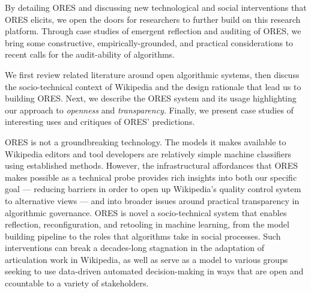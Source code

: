 By detailing ORES and discussing new technological and social interventions that ORES elicits, we open the doors for researchers to further build on this research platform\cite{terveen2014study}.  Through case studies of emergent reflection and auditing of ORES, we bring some constructive, empirically-grounded, and practical considerations to recent calls for the audit-ability of algorithms\cite{sandvig2014auditing}.


We first review related literature around open algorithmic systems, then discuss the socio-technical context of Wikipedia and the design rationale that lead us to building ORES.  Next, we describe the ORES system and its usage highlighting our approach to \emph{openness} and \emph{transparency}.  Finally, we present case studies of interesting uses and critiques of ORES' predictions.

ORES is not a groundbreaking technology. The models it makes available to Wikipedia editors and tool developers are relatively simple machine classifiers using established methods.  However, the infrastructural affordances that ORES makes possible as a technical probe provides rich insights into both our specific goal --- reducing barriers in order to open up Wikipedia's quality control system to alternative views --- and into broader issues around practical transparency in algorithmic governance. ORES is novel a socio-technical system that enables reflection, reconfiguration, and retooling in machine learning, from the model building pipeline to the roles that algorithms take in social processes.  Such interventions can break a decades-long stagnation in the adaptation of articulation work in Wikipedia, as well as serve as a model to various groups seeking to use data-driven automated decision-making in ways that are open and ccountable to a variety of stakeholders.
